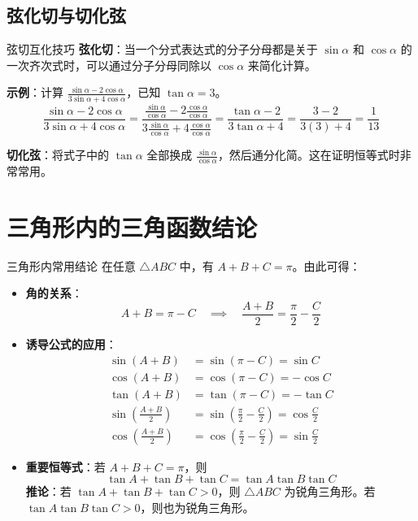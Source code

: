 \documentclass[a4paper,11pt]{ctexart}
\begin{document}
\subsection{弦化切与切化弦}
\begin{examplebox}{弦切互化技巧}
\textbf{弦化切}：当一个分式表达式的分子分母都是关于 $\sin\alpha$ 和 $\cos\alpha$ 的一次齐次式时，可以通过分子分母同除以 $\cos\alpha$ 来简化计算。

\textbf{示例}：计算 $\frac{\sin\alpha - 2\cos\alpha}{3\sin\alpha + 4\cos\alpha}$，已知 $\tan\alpha = 3$。
\[ \frac{\sin\alpha - 2\cos\alpha}{3\sin\alpha + 4\cos\alpha} = \frac{\frac{\sin\alpha}{\cos\alpha} - 2\frac{\cos\alpha}{\cos\alpha}}{3\frac{\sin\alpha}{\cos\alpha} + 4\frac{\cos\alpha}{\cos\alpha}} = \frac{\tan\alpha - 2}{3\tan\alpha + 4} = \frac{3-2}{3(3)+4} = \frac{1}{13} \]

\textbf{切化弦}：将式子中的 $\tan\alpha$ 全部换成 $\frac{\sin\alpha}{\cos\alpha}$，然后通分化简。这在证明恒等式时非常常用。
\end{examplebox}

\section{三角形内的三角函数结论}
\begin{theorembox}{三角形内常用结论}
在任意 $\triangle ABC$ 中，有 $A+B+C=\pi$。由此可得：
\begin{itemize}
    \item \textbf{角的关系}：
        \[ A+B = \pi - C \quad \implies \quad \frac{A+B}{2} = \frac{\pi}{2} - \frac{C}{2} \]
    \item \textbf{诱导公式的应用}：
        \begin{align*}
            \sin(A+B) &= \sin(\pi - C) = \sin C \\
            \cos(A+B) &= \cos(\pi - C) = -\cos C \\
            \tan(A+B) &= \tan(\pi - C) = -\tan C \\
            \sin\left(\frac{A+B}{2}\right) &= \sin\left(\frac{\pi}{2} - \frac{C}{2}\right) = \cos\frac{C}{2} \\
            \cos\left(\frac{A+B}{2}\right) &= \cos\left(\frac{\pi}{2} - \frac{C}{2}\right) = \sin\frac{C}{2}
        \end{align*}
    \item \textbf{重要恒等式}：若 $A+B+C=\pi$，则
        \begin{equation}
            \tan A + \tan B + \tan C = \tan A \tan B \tan C
        \end{equation}
        \textbf{推论}：若 $\tan A + \tan B + \tan C > 0$，则 $\triangle ABC$ 为锐角三角形。若 $\tan A \tan B \tan C > 0$，则也为锐角三角形。
\end{itemize}
\end{theorembox}
\end{document}
